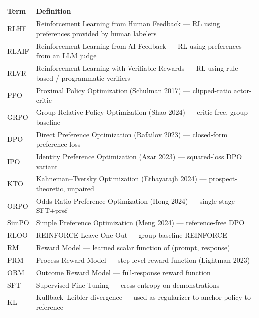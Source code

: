 {\def\LTcaptype{none} %
\begin{longtable}[]{@{}
  >{\raggedright\arraybackslash}p{}
  >{\raggedright\arraybackslash}p{}@{}}
\toprule\noalign{}
\begin{minipage}[b]{\linewidth}\raggedright
Term
\end{minipage} & \begin{minipage}[b]{\linewidth}\raggedright
Definition
\end{minipage} \\
\midrule\noalign{}
\endhead
\bottomrule\noalign{}
\endlastfoot
RLHF & Reinforcement Learning from Human Feedback --- RL using preferences provided by human labelers \\
RLAIF & Reinforcement Learning from AI Feedback --- RL using preferences from an LLM judge \\
RLVR & Reinforcement Learning with Verifiable Rewards --- RL using rule-based / programmatic verifiers \\
PPO & Proximal Policy Optimization (Schulman 2017) --- clipped-ratio actor-critic \\
GRPO & Group Relative Policy Optimization (Shao 2024) --- critic-free, group-baseline \\
DPO & Direct Preference Optimization (Rafailov 2023) --- closed-form preference loss \\
IPO & Identity Preference Optimization (Azar 2023) --- squared-loss DPO variant \\
KTO & Kahneman--Tversky Optimization (Ethayarajh 2024) --- prospect-theoretic, unpaired \\
ORPO & Odds-Ratio Preference Optimization (Hong 2024) --- single-stage SFT+pref \\
SimPO & Simple Preference Optimization (Meng 2024) --- reference-free DPO \\
RLOO & REINFORCE Leave-One-Out --- group-baseline REINFORCE \\
RM & Reward Model --- learned scalar function of (prompt, response) \\
PRM & Process Reward Model --- step-level reward function (Lightman 2023) \\
ORM & Outcome Reward Model --- full-response reward function \\
SFT & Supervised Fine-Tuning --- cross-entropy on demonstrations \\
KL & Kullback--Leibler divergence --- used as regularizer to anchor policy to reference \\

\end{longtable}}
